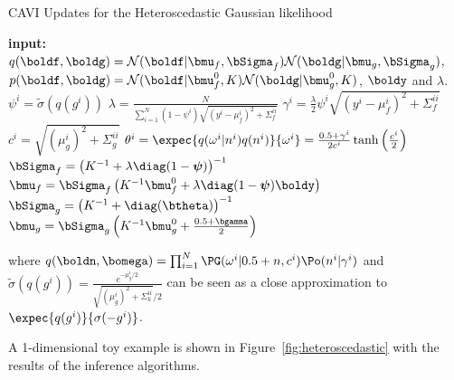 \begin{algorithm}[H]
    \caption{\ac{CAVI} Updates for the Heteroscedastic Gaussian likelihood}
    \begin{algorithmic}
        \State \textbf{input:} $q(\boldf,\boldg) = \mathcal{N}(\boldf|\bmu_f,\bSigma_f)\mathcal{N}(\boldg|\bmu_g,\bSigma_g)$, $p(\boldf,\boldg) = \mathcal{N}(\boldf|\bmu^0_f, K)\mathcal{N}(\boldg|\bmu^0_g, K)$, $\boldy$ and $\lambda$.
            \State $\psi^i = \widetilde{\sigma}(q(g^i))$
            \State $\lambda = \frac{N}{\sum_{i=1}^N (1 - \psi^i)\sqrt{(y^i - \mu_f^i)^2 + \Sigma_f^{ii}}}$
            \State $\gamma^i = \frac{\lambda}{2} \psi^i  \sqrt{(y^i - \mu_f^i)^2 + \Sigma_f^{ii}}$
            \State $c^i = \sqrt{(\mu_g^i)^2 + \Sigma^{ii}_g}$
            \State $\theta^i = \expec{q(\omega^i|n^i)q(n^i)}{\omega^i} = \frac{0.5 + \gamma^i}{2c^i}\tanh\left(\frac{c^i}{2}\right)$
            \State $\bSigma_f = \left(K^{-1} + \lambda\diag(1-\boldsymbol{\psi})\right)^{-1}$
            \State $\bmu_f = \bSigma_f\left(K^{-1}\bmu_f^0 + \lambda\diag(1 - \boldsymbol{\psi}) \boldy\right)$
            \State $\bSigma_g = \left(K^{-1} + \diag(\btheta)\right)^{-1}$
            \State $\bmu_g = \bSigma_g\left(K^{-1}\bmu_g^0 + \frac{0.5 + \bgamma}{2}\right)$
        \EndWhile
    \end{algorithmic}
    where $q(\boldn, \bomega) = \prod_{i=1}^N \PG(\omega^i|0.5 + n, c^i)\Po(n^i|\gamma^i)$ and $\widetilde{\sigma}(q(g^i)) = \frac{e^{-\mu_g^i/2}}{\sqrt{(\mu_g^i)^2 + \Sigma^{ii}_k} / 2}$ can be seen as a close approximation to $\expec{q(g^i)}{\sigma(-g^i)}$.
    \label{alg:cavi_hetero}
\end{algorithm}



A 1-dimensional toy example is shown in Figure~\ref{fig:heteroscedastic} with the results of the inference algorithms.

